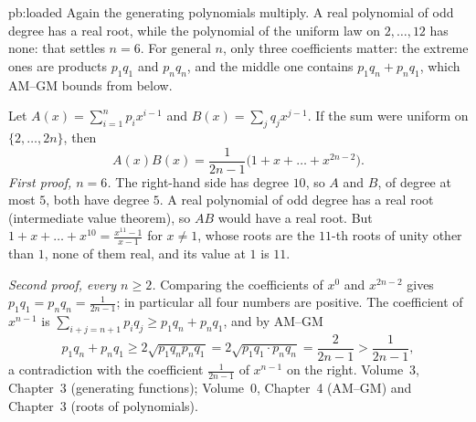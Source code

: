 \begin{solution}{pb:loaded}
\idea Again the generating polynomials multiply. A real polynomial of odd degree has a real root, while the polynomial of the
uniform law on $2,\dots,12$ has none: that settles $n=6$. For general $n$, only three coefficients matter: the extreme ones are
products $p_1q_1$ and $p_nq_n$, and the middle one contains $p_1q_n+p_nq_1$, which AM--GM bounds from below.

\writeup Let $A(x)=\sum_{i=1}^np_ix^{i-1}$ and $B(x)=\sum_jq_jx^{j-1}$. If the sum were uniform on $\{2,\dots,2n\}$, then
\[
A(x)B(x)=\frac1{2n-1}\bigl(1+x+\dots+x^{2n-2}\bigr).
\]
\emph{First proof, $n=6$.} The right-hand side has degree $10$, so $A$ and $B$, of degree at most $5$, both have degree $5$.
A real polynomial of odd degree has a real root (intermediate value theorem), so $AB$ would have a real root. But
$1+x+\dots+x^{10}=\frac{x^{11}-1}{x-1}$ for $x\ne1$, whose roots are the $11$-th roots of unity other than $1$, none of them
real, and its value at $1$ is $11$.

\emph{Second proof, every $n\ge2$.} Comparing the coefficients of $x^0$ and $x^{2n-2}$ gives $p_1q_1=p_nq_n=\frac1{2n-1}$; in
particular all four numbers are positive. The coefficient of $x^{n-1}$ is $\sum_{i+j=n+1}p_iq_j\ge p_1q_n+p_nq_1$, and by
AM--GM
\[
p_1q_n+p_nq_1\ge2\sqrt{p_1q_np_nq_1}=2\sqrt{p_1q_1\cdot p_nq_n}=\frac2{2n-1}>\frac1{2n-1},
\]
a contradiction with the coefficient $\frac1{2n-1}$ of $x^{n-1}$ on the right.
\tools Volume~3, Chapter~3 (generating functions); Volume~0, Chapter~4 (AM--GM) and Chapter~3 (roots of polynomials).
\end{solution}

